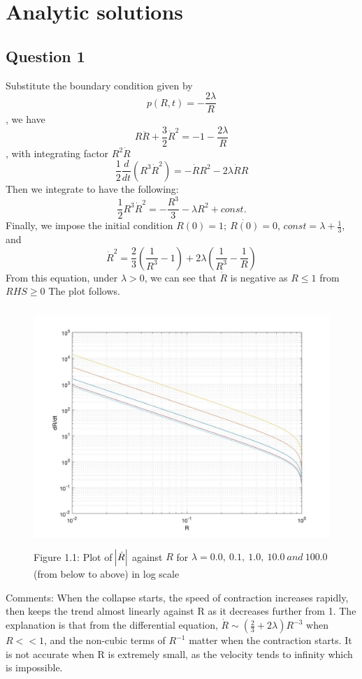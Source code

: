\documentclass[11pt]{article}
\begin{document}
\section{Analytic solutions}
\subsection{Question 1}
Substitute the boundary condition given by $$p(R,t) = -\frac{2\lambda}{R}$$, we have 
$$R\ddot{R}+\frac{3}{2}\dot{R}^2 = -1-\frac{2\lambda}{R}$$,
with integrating factor $R^2\dot{R}$ $$\frac{1}{2}\frac{d}{dt}(R^3\dot{R}^2) = -\dot{R}R^2-2\lambda\dot{R}R$$
Then we integrate to have the following:
$$\frac{1}{2} R^3\dot{R}^2 = -\frac{R^3}{3} - \lambda R^2 + const.$$ Finally,  we impose the initial condition $R(0) = 1;\ \dot{R(0)} = 0$, $const = \lambda +\frac{1}{3}$, and 
\begin{equation}
\dot{R}^2 = \frac{2}{3} \left(\frac{1}{R^3}-1\right)+2\lambda\left(\frac{1}{R^3}-\frac{1}{R}\right) \tag{2.1.1}
\end{equation}
From this equation, under $\lambda>0$, we can see that  $\dot{R}$ is negative as  $R\leqslant1$ from $RHS\geqslant0$
The plot follows.
\begin{figure}[H]
\centering
\includegraphics[width = 12cm, height = 9cm]{Q1.jpg}
\caption{Figure 1.1: Plot of $\abs{\dot{R}}$ against $R$ for $\lambda=0.0,\ 0.1,\ 1.0,\ 10.0\ and\ 100.0$ (from below to above) in log scale }
\end{figure}
Comments: When the collapse starts, the speed of contraction increases rapidly, then keeps the trend almost linearly against R as it decreases further from 1. The explanation is that from the differential equation,  $\dot{R}\sim (\frac{2}{3}+2\lambda)R^{-3}$ when $R<<1$, and the non-cubic terms of $R^{-1}$ matter when the contraction starts. It is not accurate when R is extremely small, as the velocity tends to infinity which is impossible.
\end{document}
